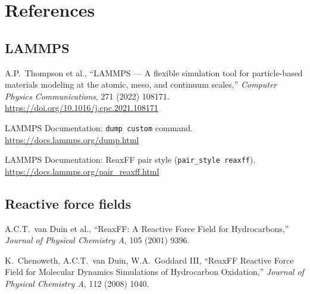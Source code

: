 \documentclass[11pt, a4paper, oneside]{article}
\begin{document}
\section*{References}
\label{sec:references}

\subsection*{LAMMPS}

\begin{enumerate}[label={[\arabic*]}, leftmargin=2.2em]

  \item A.P.\ Thompson et al.,
	``LAMMPS --- A flexible simulation tool for particle-based
	materials modeling at the atomic, meso, and continuum scales,''
	\textit{Computer Physics Communications}, 271 (2022) 108171.
	\url{https://doi.org/10.1016/j.cpc.2021.108171}

  \item LAMMPS Documentation: \texttt{dump custom} command.
	\url{https://docs.lammps.org/dump.html}

  \item LAMMPS Documentation: ReaxFF pair style (\texttt{pair\_style reaxff}).
	\url{https://docs.lammps.org/pair_reaxff.html}

\end{enumerate}

\subsection*{Reactive force fields}

\begin{enumerate}[resume, label={[\arabic*]}, leftmargin=2.2em]

  \item A.C.T.\ van Duin et al.,
	``ReaxFF: A Reactive Force Field for Hydrocarbons,''
	\textit{Journal of Physical Chemistry A}, 105 (2001) 9396.

  \item K.\ Chenoweth, A.C.T.\ van Duin, W.A.\ Goddard III,
	``ReaxFF Reactive Force Field for Molecular Dynamics
	Simulations of Hydrocarbon Oxidation,''
	\textit{Journal of Physical Chemistry A}, 112 (2008) 1040.

\end{enumerate}
\end{document}
